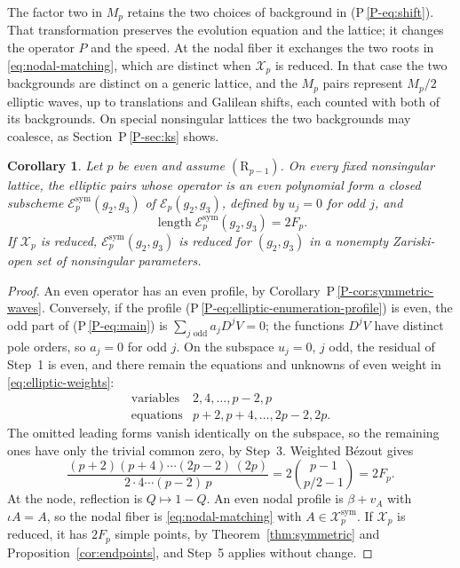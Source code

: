 \documentclass[11pt]{article}
\newtheorem{corollary}[theorem]{Corollary}
\newcommand{\len}{\operatorname{length}}
\newcommand{\Xp}{\mathcal X_p}
\numberwithin{equation}{section}
\begin{document}
The factor two in \(M_p\) retains the two choices of background in
(P\,\ref{P-eq:shift}). That transformation preserves the evolution equation
and the lattice; it changes the operator \(P\) and the speed. At the
nodal fiber it exchanges the two roots in
\eqref{eq:nodal-matching}, which are distinct when \(\Xp\) is reduced.
In that case the two backgrounds are distinct on a generic lattice, and
the \(M_p\) pairs represent \(M_p/2\) elliptic waves, up to
translations and Galilean shifts, each counted with both of its
backgrounds. On special nonsingular lattices the two backgrounds may
coalesce, as Section~P\,\ref{P-sec:ks} shows.

\begin{corollary}\label{cor:elliptic-symmetric}
Let \(p\) be even and assume \((\mathrm R_{p-1})\). On every fixed
nonsingular lattice, the elliptic pairs whose operator is an even
polynomial form a closed subscheme
\(\mathcal E_p^{\mathrm{sym}}(g_2,g_3)\) of
\(\mathcal E_p(g_2,g_3)\), defined by \(u_j=0\) for odd \(j\), and
\begin{equation}\label{eq:elliptic-symmetric-length}
 \len\mathcal E_p^{\mathrm{sym}}(g_2,g_3)=2F_p .
\end{equation}
If \(\Xp\) is reduced, \(\mathcal E_p^{\mathrm{sym}}(g_2,g_3)\) is
reduced for \((g_2,g_3)\) in a nonempty Zariski-open set of nonsingular
parameters.
\end{corollary}

\begin{proof}
An even operator has an even profile, by
Corollary~P\,\ref{P-cor:symmetric-waves}. Conversely, if the profile
(P\,\ref{P-eq:elliptic-enumeration-profile}) is even, the odd part of
(P\,\ref{P-eq:main}) is \(\sum_{j\text{ odd}}a_jD^jV=0\); the functions
\(D^jV\) have distinct pole orders, so \(a_j=0\) for odd \(j\).
On the subspace \(u_j=0\), \(j\) odd, the residual of Step~1 is even,
and there remain the equations and unknowns of even weight in
\eqref{eq:elliptic-weights}:
\[
 \begin{array}{c|c}
 \text{variables}&2,4,\ldots,p-2,p\\
 \text{equations}&p+2,p+4,\ldots,2p-2,2p.
 \end{array}
\]
The omitted leading forms vanish identically on the subspace, so the
remaining ones have only the trivial common zero, by Step~3.
Weighted B\'ezout gives
\[
 \frac{(p+2)(p+4)\cdots(2p-2)\,(2p)}{2\cdot4\cdots(p-2)\,p}
 =2\binom{p-1}{p/2-1}=2F_p .
\]
At the node, reflection is \(Q\mapsto1-Q\). An even nodal profile is
\(\beta+v_A\) with \(\iota A=A\), so the nodal fiber is
\eqref{eq:nodal-matching} with \(A\in\Xp^{\mathrm{sym}}\). If \(\Xp\)
is reduced, it has \(2F_p\) simple points, by
Theorem~\ref{thm:symmetric} and Proposition~\ref{cor:endpoints}, and
Step~5 applies without change.
\end{proof}
\end{document}
